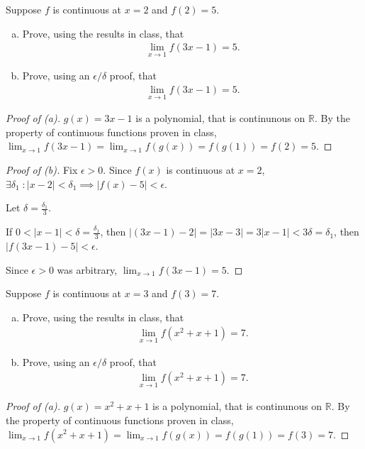 \documentclass{article} %
\theoremstyle{plain}
\theoremstyle{definition}
\begin{document}
\noindent{} Suppose $f$ is continuous at $x=2$ and $f(2)=5$. 
\begin{enumerate}[(a)]
\item Prove, using the results in class, that 
\begin{align*}
\lim_{x \rightarrow 1} f(3x-1) = 5.
\end{align*}
\item Prove, using an $\epsilon/\delta$ proof, that 
\begin{align*}
\lim_{x \rightarrow 1} f(3x-1) = 5.
\end{align*}
\end{enumerate}
  
\begin{proof}[Proof of (a)] 
    $g(x) = 3x -1$ is a polynomial, that is continunous on $\mathbb{R}$.  By the property of continuous functions proven in class, $\lim_{x \to 1} f(3x - 1) = \lim_{x \to 1} f(g(x)) = f(g(1)) = f(2) = 5$.
\end{proof}
  
\begin{proof}[Proof of (b)] Fix $\epsilon > 0$. Since $f(x)$ is continuous at $x=2$, $\exists \delta_1 \; \colon |x-2| < \delta_1 \implies |f(x) - 5| < \epsilon$.

    Let $\delta = \frac{\delta_1}{3}$.

    If $0 < |x-1| < \delta = \frac{\delta_1}{3}$, then $|(3x-1)-2| = |3x-3| = 3|x-1| < 3 \delta = \delta_1$, then $|f(3x-1) - 5| < \epsilon$.

    Since $\epsilon > 0$ was arbitrary, $\lim_{x \rightarrow 1} f(3x-1) = 5$.
\end{proof}


\noindent{} Suppose $f$ is continuous at $x=3$ and $f(3)=7$. 
\begin{enumerate}[(a)]
\item Prove, using the results in class, that 
\begin{align*}
\lim_{x \rightarrow 1} f(x^2+x+1) = 7.
\end{align*}
\item Prove, using an $\epsilon/\delta$ proof, that 
\begin{align*}
\lim_{x \rightarrow 1} f(x^2+x+1) = 7.
\end{align*}
\end{enumerate}
  
\begin{proof}[Proof of (a)] 

    $g(x) = x^2 + x + 1$ is a polynomial, that is continunous on $\mathbb{R}$.  By the property of continuous functions proven in class, $\lim_{x \to 1} f(x^2 + x + 1) = \lim_{x \to 1} f(g(x)) = f(g(1)) = f(3) = 7$.

\end{proof}
  
\end{document}
